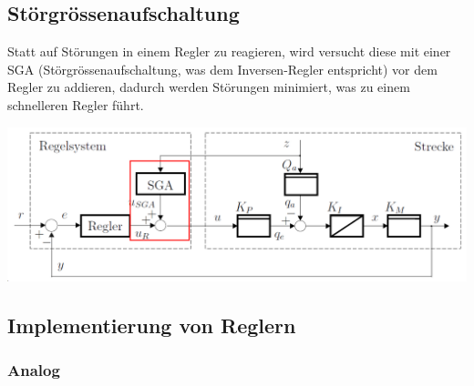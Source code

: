 \subsection{Störgrössenaufschaltung}
Statt auf Störungen in einem Regler zu reagieren, wird versucht diese mit einer SGA (Störgrössenaufschaltung, was dem Inversen-Regler entspricht) vor dem Regler zu addieren, dadurch werden Störungen minimiert, was zu einem schnelleren Regler führt. 

\begin{center}
	\includegraphics[width=0.8\columnwidth]{Images/sga1}
\end{center}

\subsection{Implementierung von Reglern}
\subsubsection{Analog}
\begin{center}
\end{center}

